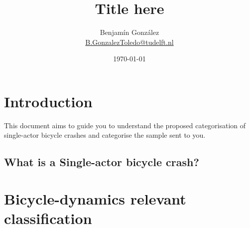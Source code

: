 \documentclass{article}
\title{Title here}
\author{
  Benjam\'in Gonz\'alez\\
  \small{\href{mailto:b.gonzaleztoledo@tudelft.nl}{B.GonzalezToledo@tudelft.nl}}
  }
\date{\today}
\begin{document}
\maketitle

\section{Introduction}

This document aims to guide you to understand the proposed categorisation of single-actor bicycle crashes and categorise the sample sent to you.

\subsection{What is a Single-actor bicycle crash?}

\section{Bicycle-dynamics relevant classification}
\end{document}
